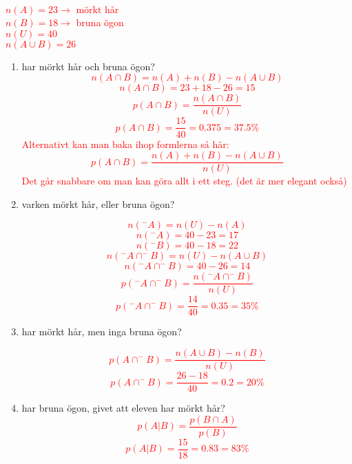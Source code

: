 \documentclass[12pt, letterpaper, twoside]{article}
\begin{document}
\begin{flushleft}
\begin{enumerate}[label=\textbf{\arabic* .}]
       \textcolor{red}{
            \\
            $ n(A) = 23 \rightarrow $ mörkt hår\\
            $ n(B) = 18 \rightarrow $ bruna ögon\\
            $ n(U) = 40 $\\
            $ n(A \cup B) = 26 $\\
        }

    \begin{enumerate}[label=\textbf{\alph*)}]
        \item
        har mörkt hår och bruna ögon?\\
        \textcolor{red}{
            $$ n(A\cap B) = n(A) + n(B) - n(A \cup B) $$
            $$ n(A\cap B) = 23 + 18 - 26 = 15 $$
            $$ p(A\cap B) = \frac{n(A\cap B)}{n(U)} $$
            $$ p(A\cap B) = \frac{15}{40} = 0.375 = 37.5\% $$
            Alternativt kan man baka ihop formlerna så här:
            $$ p(A\cap B) = \frac{n(A) + n(B) - n(A \cup B)}{n(U)} $$
            Det går snabbare om man kan göra allt i ett steg. (det är mer elegant också)
        }

        \item
        varken mörkt hår, eller bruna ögon?

        \textcolor{red}{
            $$ n(^-A) = n(U) - n(A) $$
            $$ n(^-A) = 40 - 23 = 17 $$
            $$ n(^-B) = 40 - 18 = 22 $$
            $$ n(^-A \cap ^-B) = n(U) - n(A \cup B) $$
            $$ n(^-A \cap ^-B) = 40 - 26 = 14 $$
            $$ p(^-A \cap ^-B) = \frac{n(^-A \cap ^-B)}{n(U)} $$
            $$ p(^-A \cap ^-B) = \frac{14}{40} = 0.35 = 35\% $$
        }

        \item
        har mörkt hår, men inga bruna ögon?

        \textcolor{red}{
            $$ p(A \cap ^-B) = \frac{n(A \cup B) - n(B)}{n(U)}  $$
            $$ p(A \cap ^-B) = \frac{26 - 18}{40} = 0.2 = 20\% $$
        }

        \item
        har bruna ögon, givet att eleven har mörkt hår?
    \textcolor{red}{
                $$ p(A|B) = \frac{p(B \cap A)}{p(B)} $$
                $$ p(A|B) = \frac{15}{18} = 0.83 = 83\% $$
            }
    \end{enumerate}
\end{enumerate}

\end{flushleft}
\end{document}
